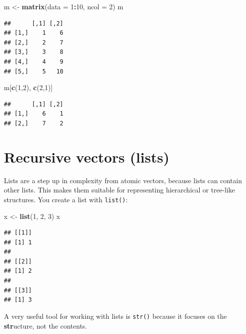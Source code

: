 \documentclass[
]{book}
\newenvironment{Shaded}{\begin{snugshade}}{\end{snugshade}}
\newcommand{\DataTypeTok}[1]{\textcolor[rgb]{0.13,0.29,0.53}{#1}}
\newcommand{\DecValTok}[1]{\textcolor[rgb]{0.00,0.00,0.81}{#1}}
\newcommand{\KeywordTok}[1]{\textcolor[rgb]{0.13,0.29,0.53}{\textbf{#1}}}
\newcommand{\NormalTok}[1]{#1}
\newcommand{\OperatorTok}[1]{\textcolor[rgb]{0.81,0.36,0.00}{\textbf{#1}}}
\newcommand{\StringTok}[1]{\textcolor[rgb]{0.31,0.60,0.02}{#1}}
\begin{document}
\begin{Shaded}
\begin{Highlighting}[]
\NormalTok{m <-}\StringTok{ }\KeywordTok{matrix}\NormalTok{(}\DataTypeTok{data =} \DecValTok{1}\OperatorTok{:}\DecValTok{10}\NormalTok{, }\DataTypeTok{ncol =} \DecValTok{2}\NormalTok{)}
\NormalTok{m}
\end{Highlighting}
\end{Shaded}

\begin{verbatim}
##      [,1] [,2]
## [1,]    1    6
## [2,]    2    7
## [3,]    3    8
## [4,]    4    9
## [5,]    5   10
\end{verbatim}

\begin{Shaded}
\begin{Highlighting}[]
\NormalTok{m[}\KeywordTok{c}\NormalTok{(}\DecValTok{1}\NormalTok{,}\DecValTok{2}\NormalTok{), }\KeywordTok{c}\NormalTok{(}\DecValTok{2}\NormalTok{,}\DecValTok{1}\NormalTok{)]}
\end{Highlighting}
\end{Shaded}

\begin{verbatim}
##      [,1] [,2]
## [1,]    6    1
## [2,]    7    2
\end{verbatim}

\hypertarget{lists}{%
\section{Recursive vectors (lists)}\label{lists}}

Lists are a step up in complexity from atomic vectors, because lists can contain other lists.
This makes them suitable for representing hierarchical or tree-like structures.
You create a list with \texttt{list()}:

\begin{Shaded}
\begin{Highlighting}[]
\NormalTok{x <-}\StringTok{ }\KeywordTok{list}\NormalTok{(}\DecValTok{1}\NormalTok{, }\DecValTok{2}\NormalTok{, }\DecValTok{3}\NormalTok{)}
\NormalTok{x}
\end{Highlighting}
\end{Shaded}

\begin{verbatim}
## [[1]]
## [1] 1
## 
## [[2]]
## [1] 2
## 
## [[3]]
## [1] 3
\end{verbatim}

A very useful tool for working with lists is \texttt{str()} because it focuses on the \textbf{str}ucture, not the contents.
\end{document}
